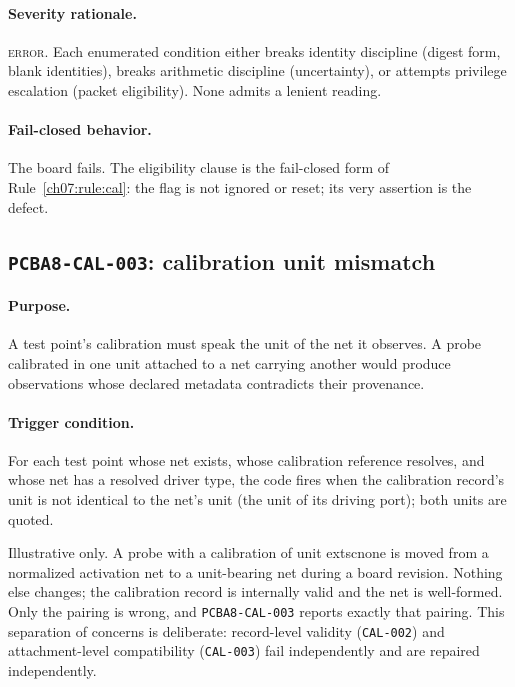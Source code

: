 \paragraph{Severity rationale.} \textsc{error}. Each enumerated condition either breaks identity discipline (digest form, blank identities), breaks arithmetic discipline (uncertainty), or attempts privilege escalation (packet eligibility). None admits a lenient reading.

\paragraph{Fail-closed behavior.} The board fails. The eligibility clause is the fail-closed form of Rule~\ref{ch07:rule:cal}: the flag is not ignored or reset; its very assertion is the defect.

\subsection{\texttt{PCBA8-CAL-003}: calibration unit mismatch}\label{ch07:sub:cal003}

\paragraph{Purpose.} A test point's calibration must speak the unit of the net it observes. A probe calibrated in one unit attached to a net carrying another would produce observations whose declared metadata contradicts their provenance.

\paragraph{Trigger condition.} For each test point whose net exists, whose calibration reference resolves, and whose net has a resolved driver type, the code fires when the calibration record's unit is not identical to the net's unit (the unit of its driving port); both units are quoted.

\begin{example}\label{ch07:ex:cal003}
Illustrative only. A probe with a calibration of unit 	extsc{none} is moved from a normalized activation net to a unit-bearing net during a board revision. Nothing else changes; the calibration record is internally valid and the net is well-formed. Only the pairing is wrong, and \texttt{PCBA8-CAL-003} reports exactly that pairing. This separation of concerns is deliberate: record-level validity (\texttt{CAL-002}) and attachment-level compatibility (\texttt{CAL-003}) fail independently and are repaired independently.
\end{example}

